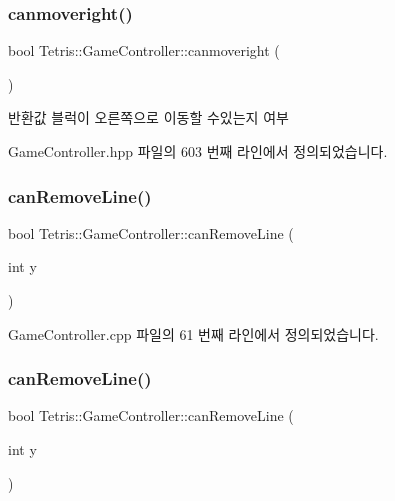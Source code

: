 \subsubsection{\texorpdfstring{canmoveright()}{canmoveright()}\hspace{0.1cm}{\footnotesize\ttfamily [2/2]}}
{\footnotesize\ttfamily bool Tetris\+::\+Game\+Controller\+::canmoveright (\begin{DoxyParamCaption}{ }\end{DoxyParamCaption})\hspace{0.3cm}{\ttfamily [inline]}}

\begin{DoxyReturn}{반환값}
블럭이 오른쪽으로 이동할 수있는지 여부 
\end{DoxyReturn}


Game\+Controller.\+hpp 파일의 603 번째 라인에서 정의되었습니다.

\mbox{\label{class_tetris_1_1_game_controller_a912bb473994e869a610ab356086cb0ad}} 
\subsubsection{\texorpdfstring{can\+Remove\+Line()}{canRemoveLine()}\hspace{0.1cm}{\footnotesize\ttfamily [1/2]}}
{\footnotesize\ttfamily bool Tetris\+::\+Game\+Controller\+::can\+Remove\+Line (\begin{DoxyParamCaption}\item[{int}]{y }\end{DoxyParamCaption})}



Game\+Controller.\+cpp 파일의 61 번째 라인에서 정의되었습니다.

\mbox{\label{class_tetris_1_1_game_controller_a912bb473994e869a610ab356086cb0ad}} 
\subsubsection{\texorpdfstring{can\+Remove\+Line()}{canRemoveLine()}\hspace{0.1cm}{\footnotesize\ttfamily [2/2]}}
{\footnotesize\ttfamily bool Tetris\+::\+Game\+Controller\+::can\+Remove\+Line (\begin{DoxyParamCaption}\item[{int}]{y }\end{DoxyParamCaption})\hspace{0.3cm}{\ttfamily [inline]}}

